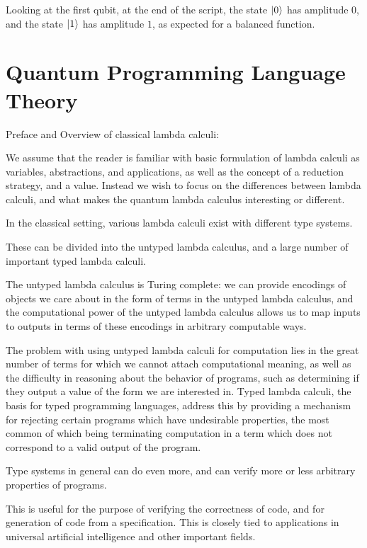 \documentclass{article}
\theoremstyle{plain}
\theoremstyle{definition}
\theoremstyle{remark}
\begin{document}
Looking at the first qubit, at the end of the script, the state $\left|\mspace{0.5mu} 0 \mspace{0.5mu}\right\rangle$ has amplitude $0$,
and the state $\left|\mspace{0.5mu} 1 \mspace{0.5mu}\right\rangle$ has amplitude $1$, as expected for a balanced function.
\pagebreak

\section{Quantum Programming Language Theory}




Preface and Overview of classical lambda calculi:
$$$$

We assume that the reader is familiar with basic formulation of lambda calculi as variables, abstractions, and applications,
as well as the concept of a reduction strategy, and a value. Instead we wish to focus on the differences between lambda calculi, and what makes the quantum lambda calculus interesting or different.

In the classical setting, various lambda calculi exist with different type systems.

These can be divided into the untyped lambda calculus, and a large number of important typed lambda calculi.

The untyped lambda calculus is Turing complete: we can provide encodings of objects we care about in the form of terms in the untyped lambda calculus,
and the computational power of the untyped lambda calculus allows us to map inputs to outputs in terms of these encodings in arbitrary computable ways.

The problem with using untyped lambda calculi for computation lies in the great number of terms for which we cannot attach computational meaning, as well as the difficulty in reasoning about the behavior of programs, such as determining if they output a value of the form we are interested in.
Typed lambda calculi, the basis for typed programming languages, address this by providing a mechanism for rejecting certain programs which have undesirable properties, the most common of which being terminating computation in a term which does not correspond to a valid output of the program.

Type systems in general can do even more, and can verify more or less arbitrary properties of programs.

This is useful for the purpose of verifying the correctness of code, and for generation of code from a specification.
This is closely tied to applications in universal artificial intelligence and other important fields.
\end{document}
